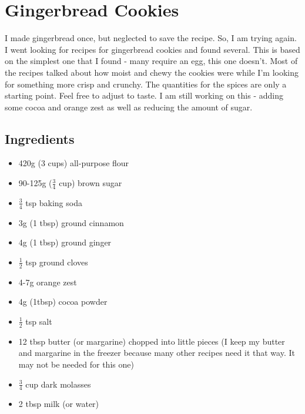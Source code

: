 \documentclass[10pt, openany]{book}
\begin{document}
\section{Gingerbread Cookies}
I made gingerbread once, but neglected to save the recipe.  So, I am trying again.  I went looking for recipes for gingerbread cookies and found several.  This is based on the simplest one that I found - many require an egg, this one doesn't.  Most of the recipes talked about how moist and chewy the cookies were while I'm looking for something more crisp and crunchy.  The quantities for the spices are only a starting point.  Feel free to adjust to taste.  I am still working on this - adding some cocoa and orange zest as well as reducing the amount of sugar.
\subsection{Ingredients}
\begin{itemize}
  \item 420g (3 cups) all-purpose flour
  \item 90-125g ($\frac{3}{4}$ cup) brown sugar
  \item $\frac{3}{4}$ tsp baking soda
  \item 3g (1 tbsp) ground cinnamon
  \item 4g (1 tbsp) ground ginger
  \item $\frac{1}{2}$ tsp ground cloves
  \item 4-7g orange zest
  \item 4g (1tbsp) cocoa powder
  \item $\frac{1}{2}$ tsp salt
  \item 12 tbsp butter (or margarine) chopped into little pieces (I keep my butter and margarine in the freezer because many other recipes need it that way.  It may not be needed for this one)
  \item $\frac{3}{4}$ cup dark molasses
  \item 2 tbsp milk (or water)
\end{itemize}
\end{document}
